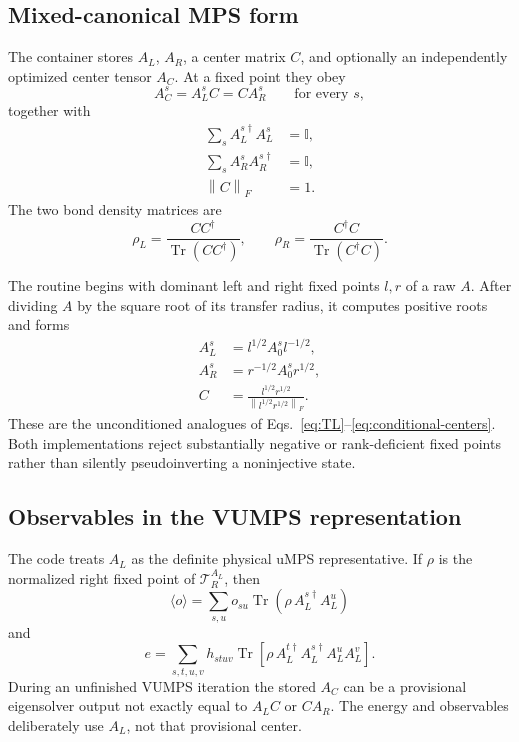 \documentclass[11pt]{article}
\newcommand{\Id}{\mathbb{I}}
\newcommand{\Tr}{\operatorname{Tr}}
\newcommand{\norm}[1]{\left\lVert #1\right\rVert}
\newcommand{\code}[1]{\texttt{\detokenize{#1}}}
\begin{document}
\subsection{Mixed-canonical MPS form}

The \code{CanonicalMPS} container stores $A_L$, $A_R$, a center matrix $C$,
and optionally an independently optimized center tensor $A_C$.  At a fixed
point they obey
\begin{equation}
  A_C^s=A_L^sC=CA_R^s
  \qquad\text{for every }s,
  \label{eq:vumps-center-relation}
\end{equation}
together with
\begin{align}
  \sum_s A_L^{s\dagger}A_L^s&=\Id,
  \label{eq:vumps-left-isometry}\\
  \sum_s A_R^sA_R^{s\dagger}&=\Id,
  \label{eq:vumps-right-isometry}\\
  \norm{C}_F&=1.
  \label{eq:vumps-center-normalization}
\end{align}
The two bond density matrices are
\begin{equation}
  \rho_L=\frac{CC^\dagger}{\Tr(CC^\dagger)},
  \qquad
  \rho_R=\frac{C^\dagger C}{\Tr(C^\dagger C)}.
  \label{eq:vumps-bond-densities}
\end{equation}

The routine \code{canonicalize} begins with dominant left and right fixed
points $l,r$ of a raw $A$.  After dividing $A$ by the square root of its
transfer radius, it computes positive roots and forms
\begin{align}
  A_L^s&=l^{1/2}A_0^s l^{-1/2},
  \label{eq:vumps-canonical-left}\\
  A_R^s&=r^{-1/2}A_0^s r^{1/2},
  \label{eq:vumps-canonical-right}\\
  C&=\frac{l^{1/2}r^{1/2}}
          {\norm{l^{1/2}r^{1/2}}_F}.
  \label{eq:vumps-canonical-center}
\end{align}
These are the unconditioned analogues of
Eqs.~\eqref{eq:TL}--\eqref{eq:conditional-centers}.
Both implementations reject substantially negative or rank-deficient fixed
points rather than silently pseudoinverting a noninjective state.

\subsection{Observables in the VUMPS representation}

The code treats $A_L$ as the definite physical uMPS representative.  If
$\rho$ is the normalized right fixed point of $\mathcal T_R^{A_L}$, then
\begin{equation}
  \langle o\rangle
  =
  \sum_{s,u}o_{su}
  \Tr\!\left(
    \rho\,A_L^{s\dagger}A_L^u
  \right)
  \label{eq:vumps-one-site-observable}
\end{equation}
and
\begin{equation}
  e
  =
  \sum_{s,t,u,v}h_{stuv}
  \Tr\!\left[
    \rho\,
    A_L^{t\dagger}A_L^{s\dagger}A_L^uA_L^v
  \right].
  \label{eq:vumps-energy}
\end{equation}
During an unfinished VUMPS iteration the stored $A_C$ can be a provisional
eigensolver output not exactly equal to $A_LC$ or $CA_R$.  The energy and
observables deliberately use $A_L$, not that provisional center.
\end{document}
